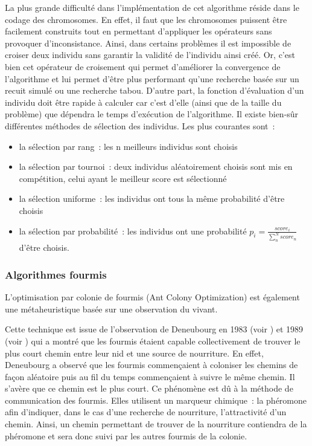 La plus grande difficulté dans l'implémentation de cet algorithme réside dans le codage des chromosomes. En effet, il faut que les chromosomes puissent être facilement construits tout en permettant d'appliquer les opérateurs sans provoquer d'inconsistance. Ainsi, dans certains problèmes il est impossible de croiser deux individu sans garantir la validité de l'individu ainsi créé. Or, c'est bien cet opérateur de croisement qui permet d'améliorer la convergence de l'algorithme et lui permet d'être plus performant qu'une recherche basée sur un recuit simulé ou une recherche tabou. D'autre part, la fonction d'évaluation d'un individu doit être rapide à calculer car c'est d'elle (ainsi que de la taille du problème) que dépendra le temps d'exécution de l'algorithme.
Il existe bien-sûr différentes méthodes de sélection des individus. Les plus courantes sont~: 
\begin{itemize}
 \item la sélection par rang~: les n meilleurs individus sont choisis
 \item la sélection par tournoi~: deux individus aléatoirement choisis sont mis en compétition, celui ayant le meilleur score est sélectionné
 \item la sélection uniforme~: les individus ont tous la même probabilité d'être choisis
 \item la sélection par probabilité~: les individus ont une probabilité $p_i = \frac{score_i}{\sum_n^{N}{score_n}}$ d'être choisis.
\end{itemize}

\subsubsection{Algorithmes fourmis}
L'optimisation par colonie de fourmis (Ant Colony Optimization) est également une métaheuristique basée sur une observation du vivant.

Cette technique est issue de l'observation de Deneubourg en 1983 (voir \cite{Deneubourg1983}) et 1989 (voir \cite{Goss1989}) qui a montré que les fourmis étaient capable collectivement de trouver le plus court chemin entre leur nid et une source de nourriture.
En effet, Deneubourg a observé que les fourmis commençaient à coloniser les chemins de façon aléatoire puis au fil du temps commençaient à suivre le même chemin. Il s'avère que ce chemin est le plus court.
Ce phénomène est dû à la méthode de communication des fourmis. Elles utilisent un marqueur chimique~: la phéromone afin d'indiquer, dans le cas d'une recherche de nourriture, l'attractivité d'un chemin.
Ainsi, un chemin permettant de trouver de la nourriture contiendra de la phéromone et sera donc suivi par les autres fourmis de la colonie.

